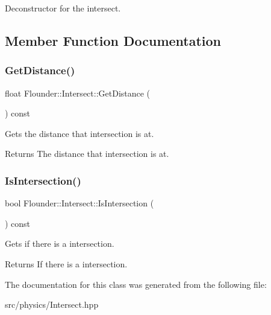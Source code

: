Deconstructor for the intersect. 



\subsection{Member Function Documentation}
\mbox{\label{class_flounder_1_1_intersect_ad4bc898c338d36479fd13425270c0a98}} 
\subsubsection{\texorpdfstring{Get\+Distance()}{GetDistance()}}
{\footnotesize\ttfamily float Flounder\+::\+Intersect\+::\+Get\+Distance (\begin{DoxyParamCaption}{ }\end{DoxyParamCaption}) const\hspace{0.3cm}{\ttfamily [inline]}}



Gets the distance that intersection is at. 

\begin{DoxyReturn}{Returns}
The distance that intersection is at. 
\end{DoxyReturn}
\mbox{\label{class_flounder_1_1_intersect_ac98abd3fe597e6dd1a69d6e49b605bab}} 
\subsubsection{\texorpdfstring{Is\+Intersection()}{IsIntersection()}}
{\footnotesize\ttfamily bool Flounder\+::\+Intersect\+::\+Is\+Intersection (\begin{DoxyParamCaption}{ }\end{DoxyParamCaption}) const\hspace{0.3cm}{\ttfamily [inline]}}



Gets if there is a intersection. 

\begin{DoxyReturn}{Returns}
If there is a intersection. 
\end{DoxyReturn}


The documentation for this class was generated from the following file\+:\begin{DoxyCompactItemize}
\item 
src/physics/Intersect.\+hpp\end{DoxyCompactItemize}
